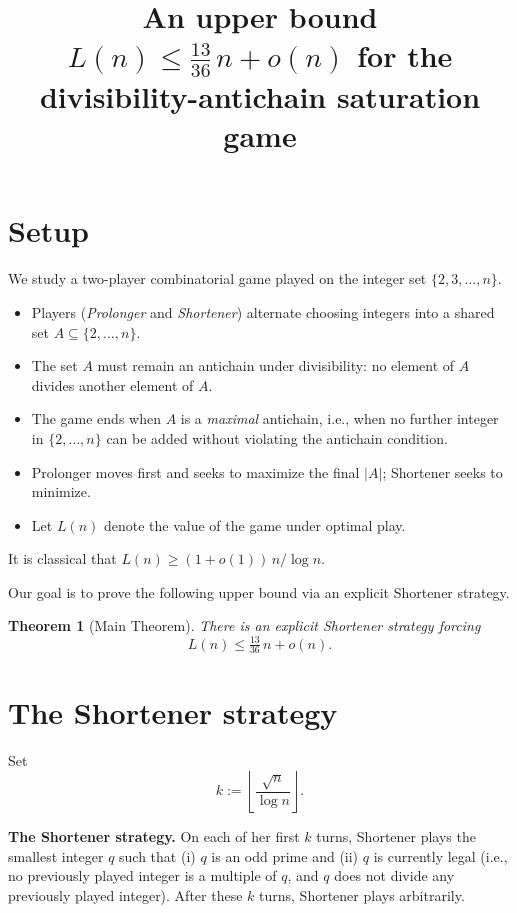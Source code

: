\documentclass{article}
\title{An upper bound $L(n) \le \tfrac{13}{36}\,n + o(n)$ for the divisibility-antichain saturation game}
\newtheorem{theorem}{Theorem}
\begin{document}
\maketitle

\section{Setup}

We study a two-player combinatorial game played on the integer set $\{2, 3, \ldots, n\}$.

\begin{itemize}
  \item Players (\emph{Prolonger} and \emph{Shortener}) alternate choosing integers into a shared set $A \subseteq \{2, \ldots, n\}$.
  \item The set $A$ must remain an antichain under divisibility: no element of $A$ divides another element of $A$.
  \item The game ends when $A$ is a \emph{maximal} antichain, i.e., when no further integer in $\{2, \ldots, n\}$ can be added without violating the antichain condition.
  \item Prolonger moves first and seeks to maximize the final $|A|$; Shortener seeks to minimize.
  \item Let $L(n)$ denote the value of the game under optimal play.
\end{itemize}

It is classical that $L(n) \ge (1 + o(1))\,n/\log n$.

Our goal is to prove the following upper bound via an explicit Shortener strategy.

\begin{theorem}[Main Theorem]
There is an explicit Shortener strategy forcing
\[
L(n) \le \tfrac{13}{36}\,n + o(n).
\]
\end{theorem}

\section{The Shortener strategy}

Set
\[
k := \left\lfloor \frac{\sqrt{n}}{\log n} \right\rfloor.
\]

\textbf{The Shortener strategy.} On each of her first $k$ turns, Shortener plays the smallest integer $q$ such that (i) $q$ is an odd prime and (ii) $q$ is currently legal (i.e., no previously played integer is a multiple of $q$, and $q$ does not divide any previously played integer). After these $k$ turns, Shortener plays arbitrarily.
\end{document}

